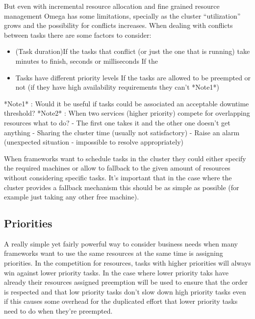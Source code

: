 \documentclass{svjour3}                     %
\begin{document}
But even with incremental resource allocation and fine grained
resource management Omega has some limitations, specially as the
cluster ``utilization'' grows and the possibility for conflicts
increases. When dealing with conflicts between tasks there are some
factors to consider:

 \begin{itemize}
   \item (Task duration)If the tasks that conflict (or just the one that is
   running) take minutes to finish, seconds or milliseconds If the
  \item Tasks have different priority levels If the tasks are allowed to be
  preempted or not (if they have high availability requirements they
  can't *Note1*)
 \end{itemize}

   
*Note1* : Would it be useful if tasks could be associated an acceptable downtime threshold?
*Note2* : When two services (higher priority) compete for overlapping resources what to do?
 - The first one takes it and the other one doesn't get anything
 - Sharing the cluster time (usually not satisfactory)
 - Raise an alarm (unexpected situation - impossible to resolve appropriately)
 
When frameworks want to schedule tasks in the cluster they could either specify the required
machines or allow to fallback to the given amount of resources without considering specific
tasks. It's important that in the case where the cluster provides a fallback mechanism 
this should be as simple as possible (for example just taking any other free machine).


\subsection{Priorities}

A really simple yet fairly powerful way to consider business needs
when many frameworks want to use the same resources at the same time
is assigning priorities. In the competition for resources, tasks with
higher priorities will always win against lower priority tasks. In the
case where lower priority taks have already their resources assigned
preemption will be used to ensure that the order is respected and that
low priority tasks don't slow down high priority tasks even if this
causes some overhead for the duplicated effort that lower priority
tasks need to do when they're preempted.
\end{document}
